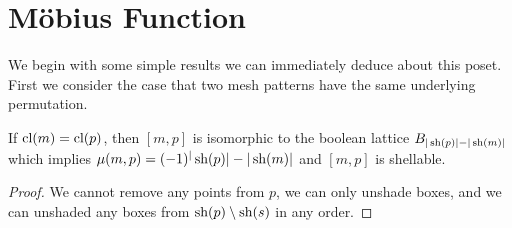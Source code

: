 \documentclass[11pt,a4paper,oneside]{article}
\begin{document}
%
%
%
%
%
%


\section{M\"obius Function}
We begin with some simple results we can immediately deduce about this poset. First we consider the case that two mesh patterns have the same underlying permutation.
\begin{lem}
If $\operatorname{\textrm{cl}}(m)=\operatorname{\textrm{cl}}(p)$, then $[m,p]$ is isomorphic to the boolean lattice $B_{|\operatorname{\textrm{sh}}(p)|-|\operatorname{\textrm{sh}}(m)|}$ which implies $\mu(m,p)=(-1)^|\operatorname{\textrm{sh}}(p)|-|\operatorname{\textrm{sh}}(m)|$ and $[m,p]$ is shellable.
\begin{proof}
We cannot remove any points from $p$, we can only unshade boxes, and we can unshaded any boxes from $\operatorname{\textrm{sh}}(p)\setminus\operatorname{\textrm{sh}}(s)$ in any order.
\end{proof}
\end{lem}
\end{document}
